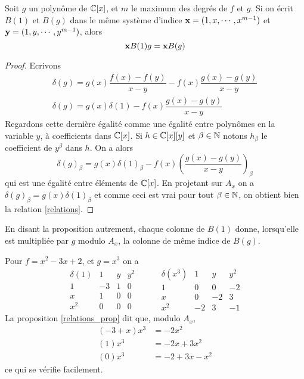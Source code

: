 \documentclass{standalone}
\begin{document}
\begin{prop}
\label{relations_prop}
Soit $g$ un polynôme de $\mathbb{C}[x]$, et $m$ le maximum des degrés de $f$ et $g$. Si on écrit $B(1)$ et $B(g)$ dans le même système d'indice $\bold{x} = (1, x,\cdots, x^{m-1})$ et $\bold{y} = (1, y,\cdots, y^{m-1})$, alors
\begin{equation}
\label{relations}
	\bold{x}B(1)g = \bold{x}B(g)
\end{equation}
\end{prop}
\begin{proof}
Ecrivons
\begin{align} \nonumber
	\delta(g) = g(x)\dfrac{f(x)-f(y)}{x-y} - f(x)\dfrac{g(x)-g(y)}{x-y} \\ \nonumber
	\delta(g) = g(x)\delta(1) - f(x)\dfrac{g(x)-g(y)}{x-y}
\end{align}
Regardons cette dernière égalité comme une égalité entre polynômes en la variable $y$, à coefficients dans $\mathbb{C}[x]$. Si $h\in \mathbb{C}[x][y]$ et $\beta\in\mathbb{N}$ notons $h_\beta$ le coefficient de $y^\beta$ dans $h$. On a alors
$$\delta(g)_\beta = g(x)\delta(1)_\beta - f(x)(\dfrac{g(x)-g(y)}{x-y})_\beta $$
qui est une égalité entre éléments de $\mathbb{C}[x]$. En projetant sur $A_x$ on a
$\delta(g)_\beta = g(x)\delta(1)_\beta$
et comme ceci est vrai pour tout $\beta\in\mathbb{N}$, on obtient bien la relation \ref{relations}.
\end{proof}
\begin{rem}
En disant la  proposition autrement, chaque colonne de $B(1)$ donne, lorsqu'elle est multipliée par $g$ modulo $A_x$, la colonne de même indice de $B(g)$.
\end{rem}
\begin{exmp}
Pour $f = x^2 - 3x + 2$, et $g = x^3$ on a
$$
\begin{array}{c|ccc}
\delta(1) & 1 & y & y^2\\
\hline
1 & -3 & 1 & 0\\
x & 1 & 0 & 0\\
x^2 & 0 & 0 & 0
\end{array}
\hspace{1cm}
\begin{array}{c|ccc}
\delta(x^3) & 1 & y & y^2\\
\hline
1 & 0 & 0 & -2\\
x & 0 & -2 & 3\\
x^2 & -2 & 3 & -1
\end{array}
$$
La proposition \ref{relations_prop} dit que, modulo $A_x$,
\begin{align} \nonumber
	(-3 + x)x^3 &= -2x^2 \\ \nonumber
	(1)x^3 &= -2x + 3x^2 \\ \nonumber
	(0)x^3 &= -2 + 3x - x^2
\end{align}
ce qui se vérifie facilement.
\end{exmp}
\end{document}
